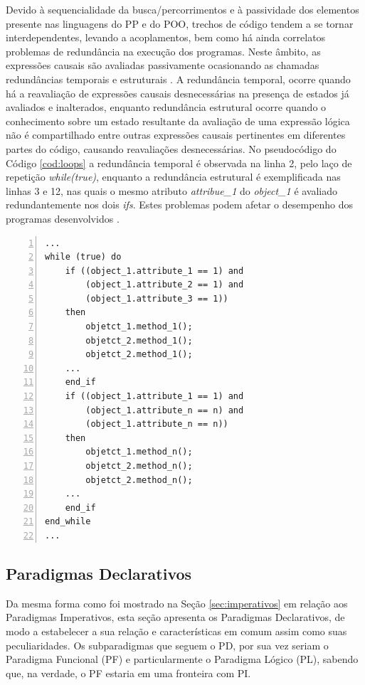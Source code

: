 Devido à sequencialidade da busca/percorrimentos e à passividade dos elementos
presente nas linguagens do PP e do POO, trechos de código tendem a se tornar
interdependentes, levando a acoplamentos, bem como há ainda correlatos problemas
de redundância na execução dos programas. Neste âmbito, as expressões causais
são avaliadas passivamente ocasionando as chamadas redundâncias temporais e
estruturais \cite{msc_Banaszewski_2009}. A redundância temporal, ocorre quando
há a reavaliação de expressões causais desnecessárias na presença de estados já
avaliados e inalterados, enquanto redundância estrutural ocorre quando o
conhecimento sobre um estado resultante da avaliação de uma expressão lógica não
é compartilhado entre outras expressões causais pertinentes em diferentes partes
do código, causando reavaliações desnecessárias. No pseudocódigo do Código
\ref{cod:loops} a redundância temporal é observada na linha 2, pelo laço de
repetição \textit{while(true)}, enquanto a redundância estrutural é
exemplificada nas linhas 3 e 12, nas quais o mesmo atributo \textit{attribue\_1}
do \textit{object\_1} é avaliado redundantemente nos dois \textit{ifs}. Estes
problemas podem afetar o desempenho dos programas desenvolvidos
\cite{msc_Banaszewski_2009}.

\begin{lstlisting}[numbers=left,
  stepnumber=1, caption = {Exemplo de
  redundâncias estruturais e temporais}, float=htb, source = {Autoria própria}, label =
  {cod:loops}]
...
while (true) do
    if ((object_1.attribute_1 == 1) and
        (object_1.attribute_2 == 1) and
        (object_1.attribute_3 == 1))
    then
        objetct_1.method_1();
        objetct_2.method_1();
        objetct_2.method_1();
    ...
    end_if
    if ((object_1.attribute_1 == 1) and
        (object_1.attribute_n == n) and
        (object_1.attribute_n == n))
    then
        objetct_1.method_n();
        objetct_2.method_n();
        objetct_2.method_n();
    ...
    end_if
end_while
...
\end{lstlisting}

\subsection{Paradigmas Declarativos}\label{sec:declarativos}

Da mesma forma como foi mostrado na Seção \ref{sec:imperativos} em relação aos
Paradigmas Imperativos, esta seção apresenta os Paradigmas Declarativos, de modo
a estabelecer a sua relação e características em comum assim como suas
peculiaridades. Os subparadigmas que seguem o PD, por sua vez seriam o Paradigma
Funcional (PF) e particularmente o Paradigma Lógico (PL), sabendo que, na verdade,
o PF estaria em uma fronteira com PI. 

